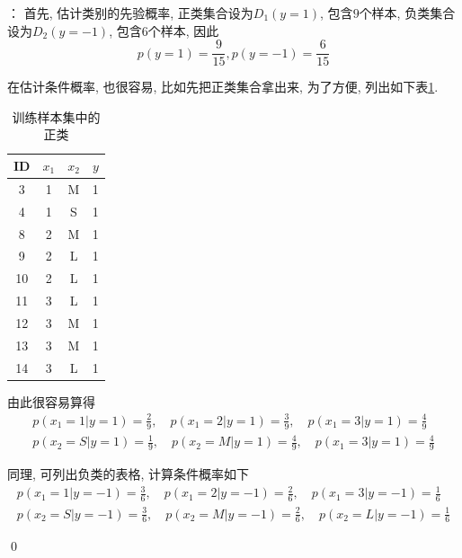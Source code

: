 \documentclass[a4paper,UTF8]{ctexart}
\theoremstyle{plain} \newtheorem{theorem}{定理}[section]
\theoremstyle{plain} \newtheorem{definition}{定义}[section]
\theoremstyle{plain} \newtheorem{lemma}{引理}[section]
\theoremstyle{plain} \newtheorem{proposition}{命题}[section]
\theoremstyle{plain} \newtheorem{example}{例}[section]
\theoremstyle{plain} \newtheorem{remark}{注}[section]
\theoremstyle{plain} \newtheorem{corollary}{推论}[section]
\newenvironment{mysolution}{{\color{blue} 解}： }{{\color{magenta}\qed}}
\begin{document}
\begin{mysolution}
首先, 估计类别的先验概率, 正类集合设为$D_1(y = 1)$, 包含$9$个样本, 负类集合设为$D_2(y = -1)$, 包含$6$个样本, 因此
\begin{equation*}
p(y = 1) = \frac{9}{15}, p(y = -1) = \frac{6}{15} 
\end{equation*}

在估计条件概率, 也很容易, 比如先把正类集合拿出来, 为了方便, 列出如下表\ref{examp1-posit}.
\begin{table}[!htb]
\centering
\caption{训练样本集中的正类}
\label{examp1-posit}
\begin{tabular}{cccc}
	\hline
    \textbf{ID} & \textbf{$x_1$} & \textbf{$x_2$} & \textbf{$y$} \\
    \hline
    3   &  1  &  M  &  1 \\
    \hline
    4   &  1  &  S  &  1 \\
    \hline
    8   &  2  &  M  &  1 \\
    \hline
    9   &  2  &  L  &  1 \\
    \hline
    10   &  2  &  L  &  1 \\
    \hline
    11   &  3  &  L  &  1 \\
    \hline
    12   &  3  &  M  &  1 \\
    \hline
    13   &  3  &  M  &  1 \\
    \hline
    14   &  3  &  L  &  1 \\
    \hline
\end{tabular}
\end{table}

由此很容易算得
\begin{align*}
p(x_1 = 1 | y = 1) = \frac{2}{9}, \quad p(x_1 = 2 | y = 1) = \frac{3}{9}, \quad p(x_1 = 3 | y = 1) = \frac{4}{9} \\ 
p(x_2 = S | y = 1) = \frac{1}{9}, \quad p(x_2 = M | y = 1) = \frac{4}{9}, \quad p(x_1 = 3 | y = 1) = \frac{4}{9}
\end{align*}

同理, 可列出负类的表格, 计算条件概率如下
\begin{align*}
p(x_1 = 1 | y = -1) = \frac{3}{6}, \quad p(x_1 = 2 | y = -1) = \frac{2}{6}, \quad p(x_1 = 3 | y = -1) = \frac{1}{6} \\ 
p(x_2 = S | y = -1) = \frac{3}{6}, \quad p(x_2 = M | y = -1) = \frac{2}{6}, \quad p(x_2 = L | y = -1) = \frac{1}{6}
\end{align*}


\end{mysolution}
\end{document}
